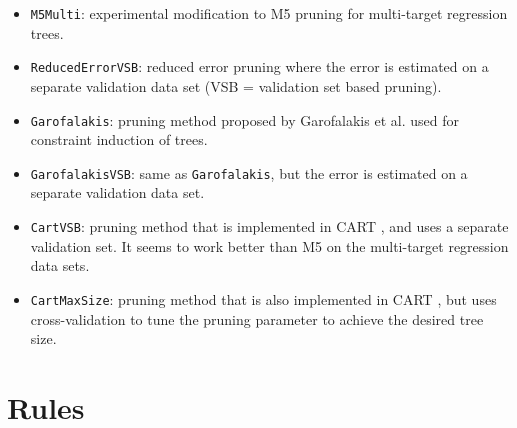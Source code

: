 \documentclass[a4paper]{report}
\begin{document}
\begin{itemize}
\begin{itemize}
		\item \texttt{M5Multi}: experimental modification to M5 \cite{Quinlan1992} pruning for multi-target regression trees.
		\item \texttt{ReducedErrorVSB}: reduced error pruning where the error is estimated on a separate validation data set (VSB = validation set based pruning).
		\item \texttt{Garofalakis}: pruning method proposed by Garofalakis et al. \cite{Garofalakis03:jrnl} used for constraint induction of trees.
		\item \texttt{GarofalakisVSB}: same as \texttt{Garofalakis}, but the error is estimated on a separate validation data set.
		\item \texttt{CartVSB}: pruning method that is implemented in CART \cite{Breiman1984}, and uses a separate validation set. It seems to work better than M5 on the multi-target regression data sets.
		\item \texttt{CartMaxSize}: pruning method that is also implemented in CART \cite{Breiman1984}, but uses cross-validation to tune the pruning parameter to achieve the desired tree size.
	\end{itemize}
\end{itemize}

\section{Rules}

\end{document}
